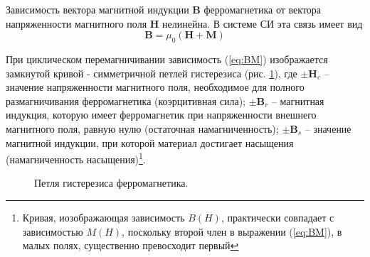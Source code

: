 \documentclass[a4paper,12pt]{article} %
\begin{document}
	Зависимость вектора магнитной индукции $\boldsymbol{B}$ ферромагнетика от вектора напряженности магнитного поля $\boldsymbol{H}$ нелинейна. В системе СИ эта связь имеет вид
	\begin{equation} \label{eq:BM}
		\boldsymbol{B} = \mu_0(\boldsymbol{H} + \boldsymbol{M})
	\end{equation}
	
	При циклическом перемагничивании зависимость (\ref{eq:BM}) изображается замкнутой кривой - симметричной петлей гистерезиса (рис. \ref{ris:hysteresis}), где $\pm \boldsymbol{H}_c$ – значение напряженности магнитного поля, необходимое для полного размагничивания ферромагнетика (коэрцитивная сила); $\pm \boldsymbol{B}_r$ – магнитная индукция, которую имеет ферромагнетик при напряженности внешнего магнитного поля, равную нулю (остаточная намагниченность); $\pm \boldsymbol{B}_s$ – значение магнитной индукции, при которой материал достигает насыщения (намагниченность насыщения)\footnote{Кривая, иозображающая зависимость $B(H)$, практически совпадает с зависимостью $M(H)$, поскольку второй член в выражении (\ref{eq:BM}), в малых полях, существенно превосходит первый}.
	\begin{figure}[H]
		\caption{Петля гистерезиса ферромагнетика.}
		\label{ris:hysteresis}
	\end{figure}

\newpage
\end{document}
